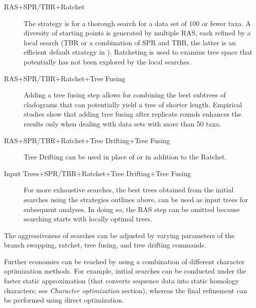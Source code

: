 \begin{description}
\item[RAS+SPR/TBR+Ratchet] The strategy is for a thorough search for a data set of 100 or fewer taxa. A diversity 
of starting points is generated by multiple RAS, each refined by a local search (TBR or a combination of SPR and TBR, 
the latter is an efficient default strategy in \poy). Ratcheting is used to examine tree space that potentially has not been 
explored by the local searches.
\item[RAS+SPR/TBR+Ratchet+Tree Fusing]  Adding a tree fusing step allows for combining the best subtrees of cladograms 
that can potentially yield a tree of shorter length. Empirical studies show that adding tree fusing after replicate rounds 
enhances the results only when dealing with data sets with more than 50 taxa.
\item[RAS+SPR/TBR+Ratchet+Tree Drifting+Tree Fusing] Tree Drifting can be used in place of or in addition to the Ratchet.
\item[Input Trees+SPR/TBR+Ratchet+Tree Drifting+Tree Fusing] For more exhaustive searches, the best trees obtained 
from the initial searches using the strategies outlines above, can be used as input trees for subsequent analyses. In doing 
so, the RAS step can be omitted because searching starts with locally optimal trees.
\end{description}

The aggressiveness of searches can be adjusted by varying parameters of the branch swapping, ratchet, tree fusing, and 
tree drifting commands.

Further economies can be reached by using a combination of different character optimization methods. For example, 
initial searches can be conducted under the faster static approximation (that converts sequence data into static homology 
characters; see \emph{Character optimization} section), whereas the final refinement can be performed using direct 
optimization.

